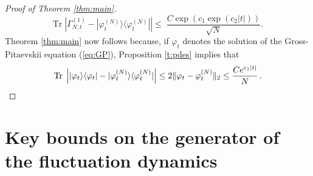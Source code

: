 \documentclass[11pt,a4paper]{article}
\newcommand{\tr}{\mbox{Tr}}
\begin{document}
\begin{proof}[Proof of Theorem \ref{thm:main}]
\[  \tr \; \left| \Gamma^{(1)}_{N,t} - |\varphi^{(N)}_t \rangle \langle \varphi_t^{(N)}| \right| \leq \; \frac{C\exp (c_1 \exp (c_2 |t|))}{\sqrt{N}}. \]
Theorem \ref{thm:main} now follows because, if $\varphi_t$ denotes the solution of the Gross-Pitaevskii equation (\ref{eq:GP}), Proposition \ref{t:pdes} implies that
\[ \tr \; \left| |\varphi_t \rangle \langle \varphi_t| -  |\varphi^{(N)}_t \rangle \langle \varphi^{(N)}_t| \right| \leq 2 \| \varphi_t - \varphi_t^{(N)} \|_2 \leq \frac{C e^{c_1 |t|}}{N} \, .\qedhere \]
\end{proof}



\section{Key bounds on the generator of the fluctuation dynamics}
\label{sec:gen-fd}
\end{document}
